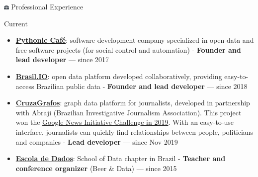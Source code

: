 \documentclass[a4paper,11pt]{article}
\begin{document}
\begin{section}{\includegraphics[height=0.6em]{icon-work} Professional Experience}
	\begin{subsection}{Current}
		\begin{itemize}
			\item
				\href{https://pythonic.cafe/}{\textbf{Pythonic Café}}: software
				development company specialized in open-data and free software
				projects (for social control and automation) -
				\textbf{Founder and lead developer} --- since 2017
			\item
				\href{https://brasil.io}{\textbf{Brasil.IO}}: open data
				platform developed collaboratively, providing easy-to-access
				Brazilian public data - \textbf{Founder and lead developer} ---
				since 2018
			\item
				\href{https://cruzagrafos.abraji.org.br/}{\textbf{CruzaGrafos}}:
				graph data platform for journalists, developed in partnership
				with Abraji (Brazilian Investigative Journalism Association).
				This project won the
				\href{https://brasil.googleblog.com/2019/11/acelerando-criacao-de-novos-produtos-e-modelos-de-negocio-na-industria-jornalistica-da-america-latina-em-30-projetos.html}{Google
				News Initiative Challenge in 2019}.
				With an easy-to-use interface, journalists can quickly find
				relationships between people, politicians and companies
				- \textbf{Lead developer} --- since Nov 2019
			\item
				\href{https://escoladedados.org/}{\textbf{Escola de Dados}}:
				School of Data chapter in Brazil - \textbf{Teacher and conference
				organizer} (Beer \& Data) --- since 2015
		\end{itemize}
	\end{subsection}


\end{section}
\end{document}
